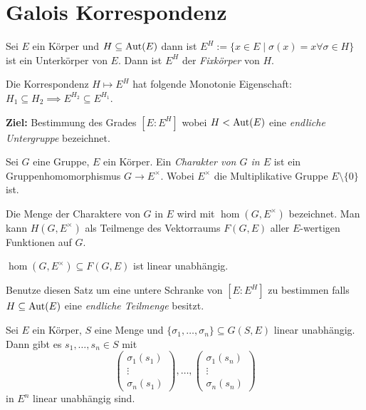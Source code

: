 \graphicspath{{Images/}}

\chapter{Galois Korrespondenz}

\begin{definition}
	Sei $E$ ein Körper und $H \subseteq \operatorname{Aut}(E)$ dann ist $E^{H} := \{x \in E \mid \sigma(x) = x \forall \sigma \in H\} $ ist ein Unterkörper von $E$.
	Dann ist $E^{H}$ der \emph{Fixkörper} von $H$.
\end{definition}

\begin{remark}
	Die Korrespondenz $H \mapsto E^{H}$ hat folgende Monotonie Eigenschaft: $H_1 \subseteq H_2 \implies E^{H_2} \subseteq E^{H_1}$.
\end{remark}


\textbf{Ziel:} Bestimmung des Grades $[E : E^{H}]$ wobei $H < \operatorname{Aut}(E)$ eine \emph{endliche Untergruppe} bezeichnet.

\begin{definition}
	Sei $G$ eine Gruppe, $E$ ein Körper.
	Ein \emph{Charakter von $G$ in $E$} ist ein Gruppenhomomorphismus $G \to E^{\times}$.
	Wobei $E^{\times}$ die Multiplikative Gruppe $E \setminus \{0\}$ ist.

	Die Menge der Charaktere von $G$ in $E$ wird mit $\hom(G,E^{\times})$ bezeichnet.
	Man kann $H(G,E^{\times})$ als Teilmenge des Vektorraums $F(G,E)$ aller $E$-wertigen Funktionen auf $G$.
\end{definition}

\begin{proposition}[Dedekind]
	$\hom(G,E^{\times}) \subseteq F(G,E)$ ist linear unabhängig.
\end{proposition}


Benutze diesen Satz um eine untere Schranke von $[E: E^{H}]$ zu bestimmen falls $H \subseteq \operatorname{Aut}(E)$ eine \emph{endliche Teilmenge} besitzt.

\begin{lemma}[Sublemma]
	Sei $E$ ein Körper, $S$ eine Menge und $\{\sigma_1,\ldots,\sigma_{n}\} \subseteq G(S,E)$ linear unabhängig.
	Dann gibt es $s_1,\ldots,s_{n} \in S$ mit 
	\[
		\begin{pmatrix} \sigma_1(s_1) \\ \vdots \\ \sigma_{n}(s_1) \end{pmatrix} ,\ldots, \begin{pmatrix} \sigma_1(s_{n}) \\ \vdots \\ \sigma_{n}(s_{n}) \end{pmatrix} 
	\] 
	in $E^{n}$ linear unabhängig sind.
\end{lemma}

